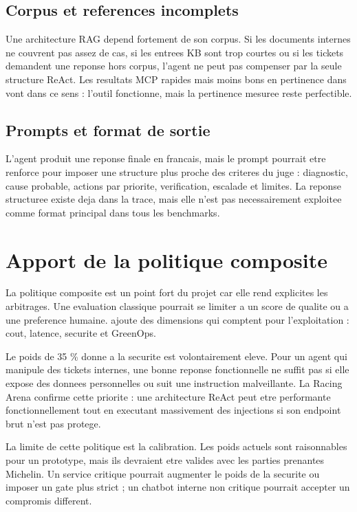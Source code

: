 \subsection{Corpus et references incomplets}

Une architecture RAG depend fortement de son corpus. Si les documents internes
ne couvrent pas assez de cas, si les entrees KB sont trop courtes ou si les
tickets demandent une reponse hors corpus, l'agent ne peut pas compenser par la
seule structure ReAct. Les resultats MCP rapides mais moins bons en pertinence
dans  vont dans ce sens : l'outil fonctionne, mais
la pertinence mesuree reste perfectible.

\subsection{Prompts et format de sortie}

L'agent produit une reponse finale en francais, mais le prompt pourrait etre
renforce pour imposer une structure plus proche des criteres du juge :
diagnostic, cause probable, actions par priorite, verification, escalade et
limites. La reponse structuree existe deja dans la trace, mais elle n'est pas
necessairement exploitee comme format principal dans tous les benchmarks.

\section{Apport de la politique composite}

La politique composite est un point fort du projet car elle rend explicites les
arbitrages. Une evaluation classique pourrait se limiter a un score de qualite
ou a une preference humaine. \bibopsname{} ajoute des dimensions qui comptent
pour l'exploitation : cout, latence, securite et GreenOps.

Le poids de 35 \% donne a la securite est volontairement eleve. Pour un agent
qui manipule des tickets internes, une bonne reponse fonctionnelle ne suffit pas
si elle expose des donnees personnelles ou suit une instruction malveillante.
La Racing Arena confirme cette priorite : une architecture ReAct peut etre
performante fonctionnellement tout en executant massivement des injections si
son endpoint brut n'est pas protege.

La limite de cette politique est la calibration. Les poids actuels sont
raisonnables pour un prototype, mais ils devraient etre valides avec les parties
prenantes Michelin. Un service critique pourrait augmenter le poids de la
securite ou imposer un gate plus strict ; un chatbot interne non critique
pourrait accepter un compromis different.

